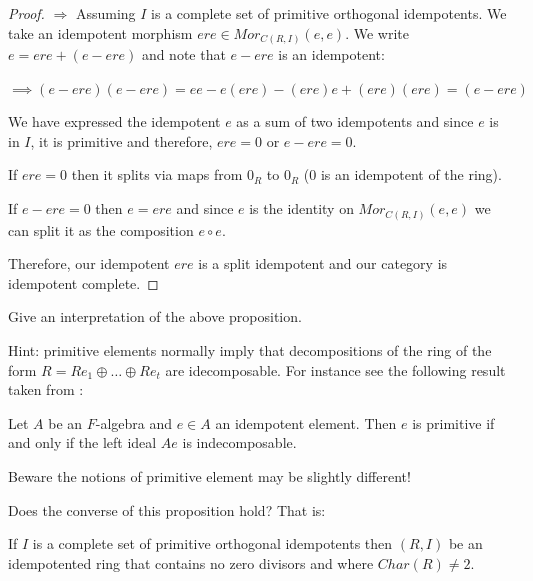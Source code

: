 \begin{proof}
$\Rightarrow$ Assuming $I$ is a complete set of primitive orthogonal idempotents. We take an idempotent morphism $ere \in Mor_{C(R,I)}(e,e)$. We write $e = ere + (e-ere)$ and note that $e-ere$ is an idempotent:

$ \implies (e-ere)(e-ere) = ee - e(ere) - (ere)e + (ere)(ere) = (e-ere)$ 

We have expressed the idempotent $e$ as a sum of two idempotents and since $e$ is in $I$, it is primitive and therefore, $ere = 0$ or $e-ere = 0$. 

If $ere = 0$ then it splits via maps from $0_R$ to $0_R$ ($0$ is an idempotent of the ring). 

If $e-ere = 0$ then $e = ere$ and since $e$ is the identity on $Mor_{C(R,I)}(e,e)$ we can split it as the composition $e \circ e$. 

Therefore, our idempotent $ere$ is a split idempotent and our category is idempotent complete. 
\end{proof}

\begin{exercise}
Give an interpretation of the above proposition. 

Hint: primitive elements normally imply that decompositions of the ring of the form $R = Re_1 \oplus \ldots \oplus Re_t$ are idecomposable. For instance see the following result taken from \cite{sydney}:

\begin{proposition}
Let $A$ be an $F$-algebra and $e \in A$ an idempotent element. Then $e$ is primitive if
and only if the left ideal $Ae$ is indecomposable.
\end{proposition}

Beware the notions of primitive element may be slightly different!
\end{exercise}

\begin{exercise}
Does the converse of this proposition hold? That is: 

\begin{proposition}
If $I$ is a complete set of primitive orthogonal idempotents then $(R,I)$ be an idempotented ring that contains no zero divisors and where $Char(R) \neq 2$.
\end{proposition}
\end{exercise}






